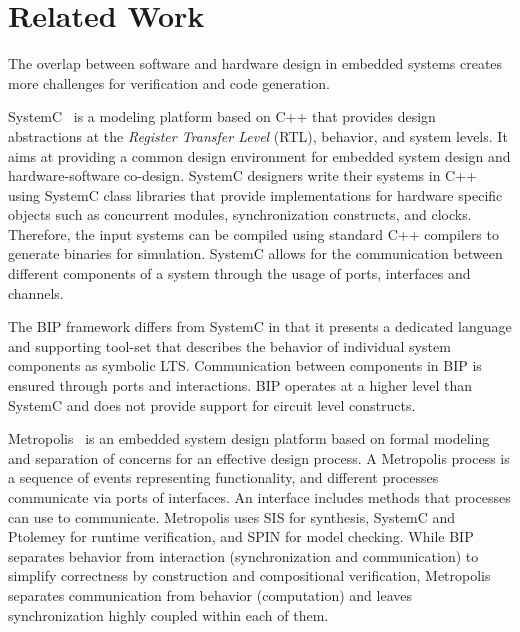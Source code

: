 \section{Related Work}
\label{sec:related}
%
The overlap between software and hardware design in embedded systems creates more challenges 
for verification and code generation. 

SystemC~\cite{systemc} is a modeling platform based on C++ that provides
design abstractions at the {\em Register Transfer Level} (RTL), behavior, and system levels. 
It aims at providing a common design environment for embedded system design and hardware-software
co-design. SystemC designers write their systems in C++ using SystemC class libraries that 
provide implementations for hardware specific objects such as concurrent modules, synchronization constructs,
and clocks.
Therefore, the input systems can be compiled using standard C++ compilers to generate binaries
for simulation. SystemC allows for the communication between different components of a system
through the usage of ports, interfaces and channels.  

The BIP framework differs from SystemC in that it presents a dedicated language and supporting
tool-set that describes the behavior of individual system components as symbolic LTS. 
Communication between components in BIP is ensured through ports and interactions.   
BIP operates at a higher level than SystemC and does not provide support for circuit level 
constructs.

Metropolis~\cite{metropolis1,metropolis2} is an embedded system design platform based on 
formal modeling and separation of concerns for an effective
design process.
%
A Metropolis process is a sequence of events representing
functionality, and different processes communicate via ports of interfaces.
%
An interface includes methods that processes can use to communicate. 
Metropolis uses SIS for synthesis, SystemC and Ptolemey for runtime verification, and SPIN for model checking.
While BIP separates behavior from interaction (synchronization and communication) to simplify correctness by construction
and compositional verification, Metropolis separates communication from behavior (computation) and leaves synchronization 
highly coupled within each of them. 




